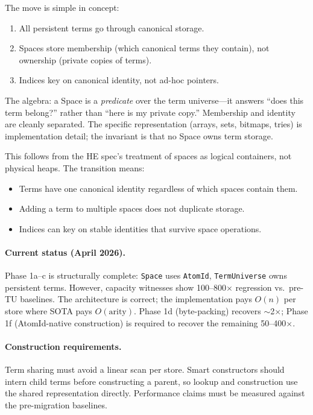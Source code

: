 \documentclass[11pt]{article}
\newcommand{\code}[1]{\texttt{#1}}
\begin{document}
The move is simple in concept:
\begin{enumerate}
\item All persistent terms go through canonical storage.
\item Spaces store membership (which canonical terms they contain),
  not ownership (private copies of terms).
\item Indices key on canonical identity, not ad-hoc pointers.
\end{enumerate}

The algebra: a Space is a \emph{predicate} over the term universe---it
answers ``does this term belong?'' rather than ``here is my private copy.''
Membership and identity are cleanly separated.  The specific representation
(arrays, sets, bitmaps, tries) is implementation detail; the invariant is
that no Space owns term storage.

This follows from the HE spec's treatment of spaces as logical containers,
not physical heaps.  The transition means:
\begin{itemize}
\item Terms have one canonical identity regardless of which spaces contain them.
\item Adding a term to multiple spaces does not duplicate storage.
\item Indices can key on stable identities that survive space operations.
\end{itemize}

\paragraph{Current status (April 2026).}
Phase 1a--c is structurally complete: \code{Space} uses \code{AtomId},
\code{TermUniverse} owns persistent terms.  However, capacity witnesses show
100--800$\times$ regression vs.\ pre-TU baselines.  The architecture is correct;
the implementation pays $O(n)$ per store where SOTA pays $O(\mathrm{arity})$.
Phase 1d (byte-packing) recovers $\sim$2$\times$; Phase 1f (AtomId-native
construction) is required to recover the remaining 50--400$\times$.

\paragraph{Construction requirements.}
Term sharing must avoid a linear scan per store. Smart constructors should
intern child terms before constructing a parent, so lookup and construction
use the shared representation directly. Performance claims must be measured
against the pre-migration baselines.
\end{document}
